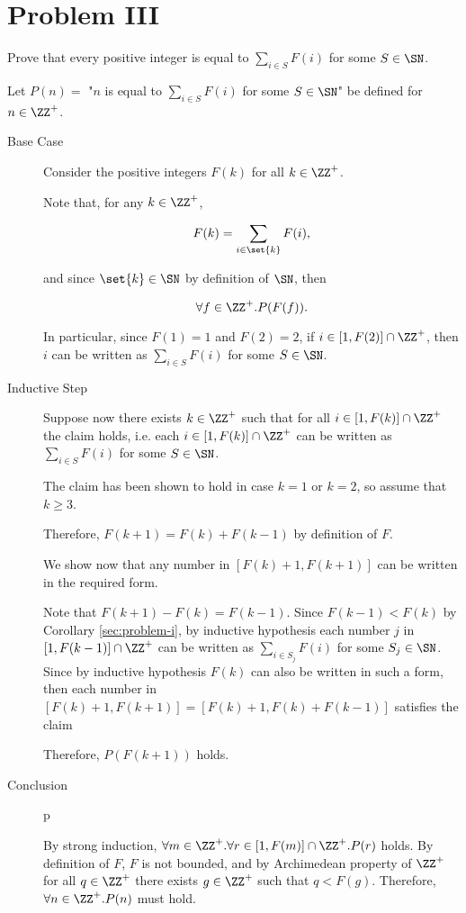 \documentclass[11pt, letterpaper]{scrartcl}
\begin{document}
\section{Problem III}
\begin{problem*}
Prove that every positive integer is equal to $\sum_{i\in S} F(i)$ for some
$S \in \SN$.
\end{problem*}

\begin{soln}
  \hfill

  Let $P(n) =$ "$n$ is equal to $\sum_{i\in S} F(i)$ for some $S \in \SN$" be defined for $n\in \ZZ^{+}$.
  
  \begin{description}
  \item[Base Case] \hfill

    Consider the positive integers $F(k)$ for all $k\in\ZZ^{+}$.

    Note that, for any $k\in\ZZ^{+}$,

    \begin{equation*}
      F(k) = \sum_{i\in\set{k}}F(i),
    \end{equation*}

    and since $\set{k}\in\SN$ by definition of $\SN$, then

    \[\forall f\in\ZZ^{+}.P(F(f)).\]

    In particular, since $F(1) = 1$ and $F(2)= 2$, if
    $i\in[1,F(2)]\cap\ZZ^{+}$, then $i$ can be written as
    $\sum_{i\in S} F(i)$ for some $S \in \SN$.

  \item[Inductive Step] \hfill

    Suppose now there exists $k\in\ZZ^{+}$ such that for all
    $i\in[1, F(k)]\cap \ZZ^+$ the claim holds, i.e. each $i\in[1, F(k)]\cap \ZZ^+$ can be
    written as $\sum_{i\in S} F(i)$ for some $S \in \SN$.

    The claim has been shown to hold in case $k=1$ or $k=2$, so assume
    that $k\geq 3$.

    Therefore, $F(k+1) = F(k)+F(k-1)$ by definition of $F$.

    We show now that any number in $[F(k)+1, F(k+1)]$ can be written
    in the required form.

    Note that $F(k+1) - F(k) = F(k-1)$. Since $F(k-1) < F(k)$ by
    Corollary \ref{sec:problem-i}, by inductive hypothesis each number
    $j$ in $[1,F(k-1)]\cap\ZZ^{+}$ can be written as
    $\sum_{i\in S_j} F(i)$ for some $S_{j} \in \SN$. Since by
    inductive hypothesis $F(k)$ can also be written in such a form,
    then each number in $[F(k)+1, F(k+1)] = [F(k)+1, F(k)+F(k-1)]$ satisfies the claim

    Therefore, $P(F(k+1))$ holds.
  \item[Conclusion]
p    \hfill

    By strong induction, $\forall m\in\ZZ^{+}.\forall r\in [1, F(m)]\cap\ZZ^+.P(r)$ holds. By
    definition of $F$, $F$ is not bounded, and by Archimedean property
    of $\ZZ^{+}$ for all $q\in\ZZ^{+}$ there exists $g\in\ZZ^{+}$ such
    that $q < F(g)$. Therefore, $\forall n\in\ZZ^{+}.P(n)$ must hold.
  \end{description}
\end{soln}
\end{document}
